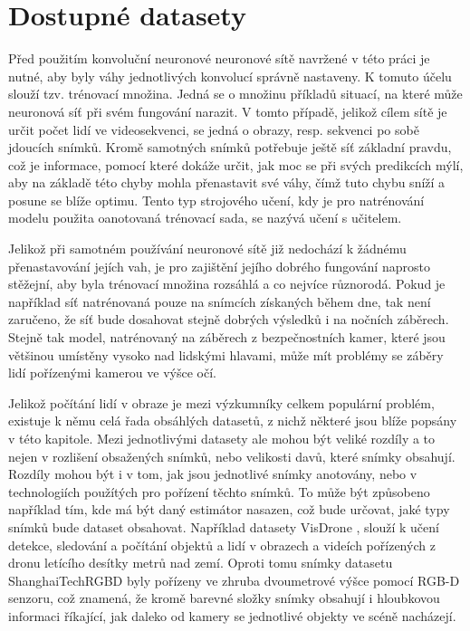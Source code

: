 \chapter{Dostupné datasety}
\label{sec:Datasets}
Před použitím konvoluční neuronové neuronové sítě navržené v této práci je nutné, aby byly váhy jednotlivých konvolucí správně nastaveny.
K tomuto účelu slouží tzv. trénovací množina.
Jedná se o množinu příkladů situací, na které může neuronová síť při svém fungování narazit.
V tomto případě, jelikož cílem sítě je určit počet lidí ve videosekvenci, se jedná o obrazy, resp. sekvenci po sobě jdoucích snímků.
Kromě samotných snímků potřebuje ještě síť základní pravdu, což je informace, pomocí které dokáže určit, jak moc se při svých predikcích mýlí, aby na základě této chyby mohla přenastavit své váhy, čímž tuto chybu sníží a posune se blíže optimu.
Tento typ strojového učení, kdy je pro natrénování modelu použita oanotovaná trénovací sada, se nazývá učení s učitelem.

Jelikož při samotném používání neuronové sítě již nedochází k žádnému přenastavování jejích vah, je pro zajištění jejího dobrého fungování naprosto stěžejní, aby byla trénovací množina rozsáhlá a co nejvíce různorodá.
Pokud je například síť natrénovaná pouze na snímcích získaných během dne, tak není zaručeno, že síť bude dosahovat stejně dobrých výsledků i na nočních záběrech.
Stejně tak model, natrénovaný na záběrech z bezpečnostních kamer, které jsou většinou umístěny vysoko nad lidskými hlavami, může mít problémy se záběry lidí pořízenými kamerou ve výšce očí.

Jelikož počítání lidí v obraze je mezi výzkumníky celkem populární problém, existuje k němu celá řada obsáhlých datasetů, z nichž některé jsou blíže popsány v této kapitole.
Mezi jednotlivými datasety ale mohou být veliké rozdíly a to nejen v rozlišení obsažených snímků, nebo velikosti davů, které snímky obsahují.
Rozdíly mohou být i v tom, jak jsou jednotlivé snímky anotovány, nebo v technologiích použítých pro pořízení těchto snímků.
To může být způsobeno například tím, kde má být daný estimátor nasazen, což bude určovat, jaké typy snímků bude dataset obsahovat.
Například datasety VisDrone \cite{VisDrone-Dataset-1, VisDrone-Dataset-2}, slouží k učení detekce, sledování a počítání objektů a lidí v obrazech a videích pořízených z dronu letícího desítky metrů nad zemí.
Oproti tomu snímky datasetu ShanghaiTechRGBD \cite{ShanghaiTechRGBD-1, ShanghaiTechRGBD-2} byly pořízeny ve zhruba dvoumetrové výšce pomocí RGB-D senzoru, což znamená, že kromě barevné složky snímky obsahují i hloubkovou informaci říkající, jak daleko od kamery se jednotlivé objekty ve scéně nacházejí.

